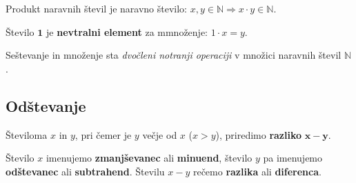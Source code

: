 \begin{figure}[H]
            
    \end{figure}

     
        Produkt naravnih števil je naravno število: $x, y \in \mathbb{N} \Rightarrow x\cdot y \in \mathbb{N}$.
        \newline

        Število $\mathbf{1}$ je \textbf{nevtralni element} za mmnoženje: $1\cdot x = y$.
     \newline

 
        Seštevanje in množenje sta \textit{dvočleni notranji operaciji} v množici naravnih števil $\mathbb{N}$.

 
    

     \subsection{Odštevanje}
        Številoma $x$ in $y$, pri čemer je $y$ večje od $x$ ($x>y$), priredimo \textbf{razliko} $\mathbf{x-y}$.                
        \newline

        Število $x$ imenujemo \textbf{zmanjševanec} ali \textbf{minuend}, število $y$  pa imenujemo \textbf{odštevanec} ali \textbf{subtrahend}. 
        Številu $x-y$ rečemo \textbf{razlika} ali \textbf{diferenca}. 

